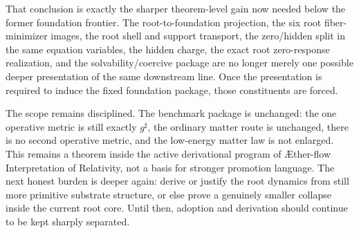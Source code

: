 \documentclass[11pt]{article}
\newcommand{\Aflow}{\AE{}ther-flow}
\newcommand{\TheoryName}{\Aflow{} Interpretation of Relativity}
\newcommand{\CompletedMetric}{g^{\sharp}}
\begin{document}
That conclusion is exactly the sharper theorem-level gain now needed below the former foundation frontier. The root-to-foundation projection, the six root fiber-minimizer images, the root shell and support transport, the zero/hidden split in the same equation variables, the hidden charge, the exact root zero-response realization, and the solvability/coercive package are no longer merely one possible deeper presentation of the same downstream line. Once the presentation is required to induce the fixed foundation package, those constituents are forced.

The scope remains disciplined. The benchmark package is unchanged: the one operative metric is still exactly \(\CompletedMetric\), the ordinary matter route is unchanged, there is no second operative metric, and the low-energy matter law is not enlarged. This remains a theorem inside the active derivational program of \TheoryName{}, not a basis for stronger promotion language. The next honest burden is deeper again: derive or justify the root dynamics from still more primitive substrate structure, or else prove a genuinely smaller collapse inside the current root core. Until then, adoption and derivation should continue to be kept sharply separated.
\end{document}
